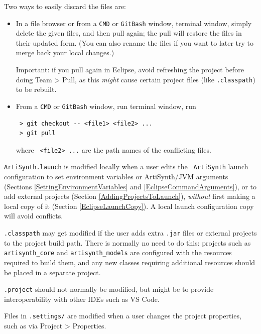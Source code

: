 Two ways to easily discard the files are:

\begin{itemize}

\item In a file browser or from a
\ifWindows
{\tt CMD} or {\tt GitBash} window,
\else
terminal window,
\fi
simply delete the given files, and then pull again; the pull
will restore the files in their updated form. (You can also
rename the files if you want to later try to merge back your local
changes.)

\begin{sideblock}
Important: if you pull again in Eclipse, avoid refreshing the
project before doing {\sf Team > Pull}, as this {\it might} cause
certain project files (like {\tt .classpath}) to be rebuilt.
\end{sideblock}

\item From a 
\ifWindows
{\tt CMD} or {\tt GitBash} window, run
\else
terminal window, run
\fi
\begin{verbatim}
 > git checkout -- <file1> <file2> ...
 > git pull
\end{verbatim}
where {\tt <file1> <file2> ...} are the path names of the conflicting files.

\end{itemize}

\begin{sideblock}
{\tt ArtiSynth.launch} is modified locally when a user edits the {\tt
ArtiSynth} launch configuration to set environment variables
or ArtiSynth/JVM arguments (Sections \ref{SettingEnvironmentVariables} and
\ref{EclipseCommandArguments}), or to add external projects 
(Section \ref{AddingProjectsToLaunch}), {\it without} first making a
local copy of it (Section \ref{EclipseLaunchCopy}). A local launch
configuration copy will avoid conflicts.

{\tt .classpath} may get modified if the user adds extra {\tt .jar}
files or external projects to the project build path. There is
normally no need to do this: projects such as {\tt artisynth\_core}
and {\tt artisynth\_models} are configured with the resources required
to build them, and any new classes requiring additional resources
should be placed in a separate project.

{\tt .project} should not normally be modified, but might be to provide
interoperability with other IDEs such as VS Code. 

Files in {\tt .settings/} are modified when a user changes the project
properties, such as via {\sf Project > Properties}.
\end{sideblock}

